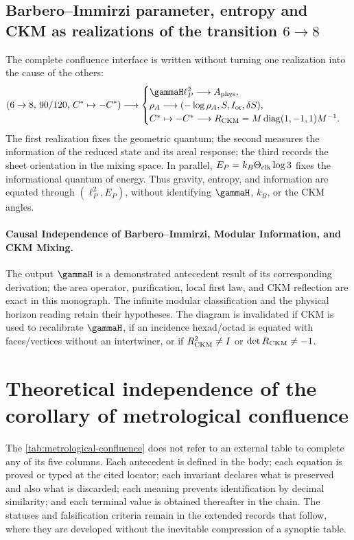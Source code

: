 \subsection{Barbero--Immirzi parameter, entropy and CKM as realizations of the transition \(6\to8\)}

The complete confluence interface is written without turning one
realization into the cause of the others:
\begin{equation}
(6\to8,\,90/120,\,C^*\mapsto-C^*)\longrightarrow
\begin{cases}
\gammaH\ell_P^2\longrightarrow A_{\rm phys},\\
\rho_A\longrightarrow(-\log\rho_A,S,I_{\rm or},\delta S),\\
C^*\mapsto-C^*\longrightarrow
R_{\rm CKM}=M\operatorname{diag}(1,-1,1)M^{-1}.
\end{cases}
\label{eq:atlas-bic-entropy-ckm}
\end{equation}
The first realization fixes the geometric quantum; the second measures the information of the reduced state and its areal response; the third records the sheet orientation in the mixing space. In parallel, \(E_P=k_B\Theta_{\rm clk}\log3\) fixes the informational quantum of energy. Thus gravity, entropy, and information are equated through \((\ell_P^2,E_P)\), without identifying \(\gammaH\), \(k_B\), or the CKM angles.

\paragraph{Causal Independence of Barbero--Immirzi, Modular Information, and CKM Mixing.}
The output \(\gammaH\) is a demonstrated antecedent result of its corresponding derivation; the
area operator, purification, local first law, and CKM reflection
are exact in this monograph. The infinite modular classification and the physical
horizon reading retain their hypotheses. The diagram is invalidated if
CKM is used to recalibrate \(\gammaH\), if an incidence hexad/octad is equated with
faces/vertices without an intertwiner, or if
\(R_{\rm CKM}^2\ne I\) or \(\det R_{\rm CKM}\ne-1\).

\section{Theoretical independence of the corollary of metrological confluence}

The \cref{tab:metrological-confluence} does not refer to an external table to
complete any of its five columns. Each antecedent is defined in the
body; each equation is proved or typed at the cited locator;
each invariant declares what is preserved and also what is discarded; each
meaning prevents identification by decimal similarity; and each terminal value is
obtained thereafter in the chain. The statuses and falsification criteria remain in the
extended records that follow, where they are developed without the inevitable compression
of a synoptic table.

